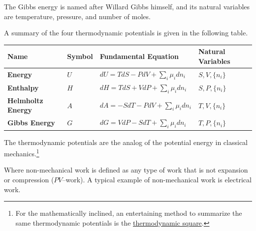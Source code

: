 \documentclass[
  9pt,
]{extbook}
\newcounter{none} %
\theoremstyle{definition}
\theoremstyle{definition}
\theoremstyle{definition}
\theoremstyle{definition}
\theoremstyle{remark}
\begin{document}
The Gibbs energy is named after Willard Gibbs himself, and its natural variables are temperature, pressure, and number of moles.

A summary of the four thermodynamic potentials is given in the following table.

\tiny

{\def\LTcaptype{none} %
\begin{longtable}[]{@{}
  >{\centering\arraybackslash}p{}
  >{\centering\arraybackslash}p{}
  >{\centering\arraybackslash}p{}
  >{\centering\arraybackslash}p{}@{}}
\toprule\noalign{}
\begin{minipage}[b]{\linewidth}\centering
\textbf{Name}
\end{minipage} & \begin{minipage}[b]{\linewidth}\centering
\textbf{Symbol}
\end{minipage} & \begin{minipage}[b]{\linewidth}\centering
\textbf{Fundamental Equation}
\end{minipage} & \begin{minipage}[b]{\linewidth}\centering
\textbf{Natural Variables}
\end{minipage} \\
\midrule\noalign{}
\endhead
\bottomrule\noalign{}
\endlastfoot
\textbf{Energy} & \(U\) & \(dU=TdS-PdV+\sum_i\mu_i dn_i\) & \(S,V,\{n_i\}\) \\
\textbf{Enthalpy} & \(H\) & \(dH=TdS+VdP+\sum_i\mu_i dn_i\) & \(S,P,\{n_i\}\) \\
\textbf{Helmholtz Energy} & \(A\) & \(dA=-SdT-PdV+\sum_i\mu_i dn_i\) & \(T,V,\{n_i\}\) \\
\textbf{Gibbs Energy} & \(G\) & \(dG=VdP-SdT+\sum_i\mu_i dn_i\) & \(T,P,\{n_i\}\) \\
\end{longtable}
}

\normalsize

The thermodynamic potentials are the analog of the potential energy in classical mechanics.\footnote{For the mathematically inclined, an entertaining method to summarize the same thermodynamic potentials is the \href{https://en.wikipedia.org/wiki/Thermodynamic_square}{thermodynamic square}.}

Where non-mechanical work is defined as any type of work that is not expansion or compression (\(PV\)--work). A typical example of non-mechanical work is electrical work.
\end{document}
